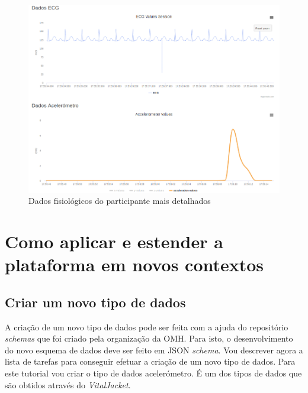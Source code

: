  \begin{figure}[H]
\centering
\includegraphics[width=1\textwidth]{imgs/withzoom-choosen-web.png}
\caption[Dados fisiológicos do participante mais detalhados]{Dados fisiológicos do participante mais detalhados}
\label{f:withzoom}
 \end{figure}
\section{Como aplicar e estender a plataforma em novos contextos}


\subsection{Criar um novo tipo de dados}

A criação de um novo tipo de dados pode ser feita com a ajuda do repositório \textit{schemas} \cite{schemas-rep} que foi criado pela organização da \gls{OMH}. Para isto, o desenvolvimento do novo esquema de dados deve ser feito em \gls{JSON} \textit{schema}. Vou descrever agora a lista de tarefas para conseguir efetuar a criação de um novo tipo de dados. Para este tutorial vou criar o tipo de dados acelerómetro. É um dos tipos de dados que são obtidos através do \textit{VitalJacket}.

